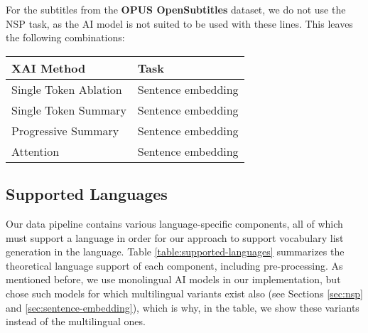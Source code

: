 For the subtitles from the \textbf{OPUS OpenSubtitles} dataset, we do not use the NSP task, as the AI model is not suited to be used with these lines.
This leaves the following combinations:

\begin{table}[H]
	\centering
	\begin{tabularx}{\textwidth}{|X|X|}
		\hline
		\textbf{XAI Method}   & \textbf{Task}      \\
		\hline
		Single Token Ablation & Sentence embedding \\
		\hline
		Single Token Summary  & Sentence embedding \\
		\hline
		Progressive Summary   & Sentence embedding \\
		\hline
		Attention             & Sentence embedding \\
		\hline
	\end{tabularx}
\end{table}



% 	

\subsection{Supported Languages} \label{sec:supported-languages}
Our data pipeline contains various language-specific components, all of which must support a language in order for our approach to support vocabulary list generation in the language.
Table \ref{table:supported-languages} summarizes the theoretical language support of each component, including pre-processing.
As mentioned before, we use monolingual AI models in our implementation, but chose such models for which multilingual variants exist also (see Sections \ref{sec:nsp} and \ref{sec:sentence-embedding}), which is why, in the table, we show these variants instead of the multilingual ones.

